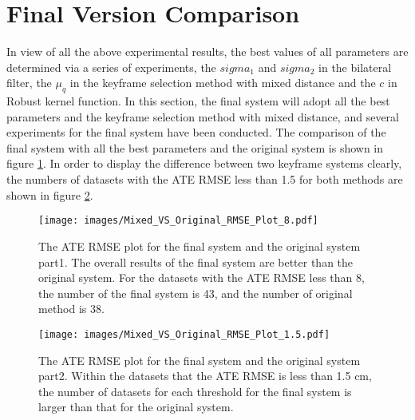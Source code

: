 \section{Final Version Comparison}
\label{sec:Final Version Comparison}
In view of all the above experimental results, the best values of all parameters are determined via a series of experiments, the $sigma_1$ and $sigma_2$ in the bilateral filter, the $\mu_q$ in the keyframe selection method with mixed distance and the $c$ in Robust kernel function. In this section, the final system will adopt all the best parameters and the keyframe selection method with mixed distance, and several experiments for the final system have been conducted. The comparison of the final system with all the best parameters and the original system is shown in figure \ref{Mixed_VS_Original_RMSE_Plot_8}. In order to display the difference between two keyframe systems clearly, the numbers of datasets with the ATE RMSE less than 1.5 for both methods are shown in figure \ref{Mixed_VS_Original_RMSE_Plot_1.5}.
\begin{figure}[thb]
    \centering
    \texttt{[image: images/Mixed\_VS\_Original\_RMSE\_Plot\_8.pdf]}
    \caption[The ATE RMSE plot for the final system and the original system part1]{The ATE RMSE plot for the final system and the original system part1. The overall results of the final system are better than the original system. For the datasets with the ATE RMSE less than 8,  the number of the final system is 43, and the number of original method is 38.}\label{Mixed_VS_Original_RMSE_Plot_8}
\end{figure}

\begin{figure}[thb]
    \centering
    \texttt{[image: images/Mixed\_VS\_Original\_RMSE\_Plot\_1.5.pdf]}
    \caption[The ATE RMSE plot for the final system and the original system part2]{The ATE RMSE plot for the final system and the original system part2. Within the datasets that the ATE RMSE is less than 1.5 cm, the number of datasets for each threshold for the final system is larger than that for the original system.}\label{Mixed_VS_Original_RMSE_Plot_1.5}
\end{figure}

